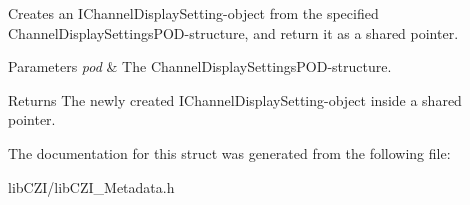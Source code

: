 Creates an I\+Channel\+Display\+Setting-\/object from the specified Channel\+Display\+Settings\+P\+O\+D-\/structure, and return it as a shared pointer. 
\begin{DoxyParams}{Parameters}
{\em pod} & The Channel\+Display\+Settings\+P\+O\+D-\/structure. \\
\hline
\end{DoxyParams}
\begin{DoxyReturn}{Returns}
The newly created I\+Channel\+Display\+Setting-\/object inside a shared pointer. 
\end{DoxyReturn}


The documentation for this struct was generated from the following file\+:\begin{DoxyCompactItemize}
\item 
lib\+C\+Z\+I/lib\+C\+Z\+I\+\_\+\+Metadata.\+h\end{DoxyCompactItemize}
